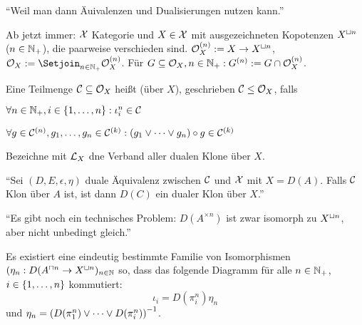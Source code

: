 \documentclass{book}
\begin{document}
\begin{answer}
    ``Weil man dann Äuivalenzen und Dualisierungen nutzen kann.''
\end{answer}

Ab jetzt immer: $\mathcal{X}$ Kategorie und $X\in\mathcal{X}$ mit ausgezeichneten Kopotenzen $X^{\mathbin{\sqcup} n}$ ($n\in\mathbb{N}_+$), die paarweise verschieden sind. $\mathcal{O}_X^{(n)}:=X\rightarrow X^{\mathbin{\sqcup} n}$, $\cO_X:=\Setjoin_{n\in\nats_+}{\cO_X^{(n)}}$. Für $G\subseteq\mathcal{O}_X,n\in\mathbb{N}_+: G^{(n)}:=G\cap\mathcal{O}_X^{(n)}$.

\begin{definition}
    Eine Teilmenge $\mathcal{C}\subseteq\mathcal{O}_X$ heißt  (über $X$), geschrieben $\mathcal{C}\leq\mathcal{O}_X$, falls
    \begin{statements}
            \item $\forall n\in\mathbb{N}_+,i\in\left\{1,\ldots,n\right\}:\iota_i^n\in\mathcal{C}$
        \item $\forall g\in\mathcal{C}^{(n)},g_1,\ldots,g_n\in\mathcal{C}^{(k)}:(g_1\vee\cdots\vee g_n)\circ g\in\mathcal{C}^{(k)}$
    \end{statements}
\end{definition}

\begin{definition}
    Bezeichne mit $\mathcal{L}_X$ dne Verband aller dualen Klone über $X$.
\end{definition}

\begin{question}
    ``Sei $(D,E,\epsilon,\eta)$ duale Äquivalenz zwischen $\mathcal{C}$ und $\mathcal{X}$ mit $X=D(A)$. Falls $\mathcal{C}$ Klon über $A$ ist, ist dann $D(C)$ ein dualer Klon über $X$.''
\end{question}

\begin{answer}
    ``Es gibt noch ein technisches Problem: $D(A^{\times n})$ ist zwar isomorph zu $X^{\mathbin{\sqcup} n}$, aber nicht unbedingt gleich.'' 
\end{answer}

\begin{lemma}
    Es existiert eine eindeutig bestimmte Familie von Isomorphismen $(\eta_n:D(A^{\mathbin{\sqcap} n}\rightarrow X^{\mathbin{\sqcup} n})_{n\in\mathbb{N}}$ so, dass das folgende Diagramm für alle $n\in\mathbb{N}_+$, $i\in\left\{1,\ldots,n\right\}$ kommutiert:
    $$
    \iota_i=D(\pi_i^n)\eta_n
    $$
    und $\eta_n={(D(\pi^n_1)\vee\cdots\vee D(\pi^n_i))}^{-1}$.
\end{lemma}
\end{document}
